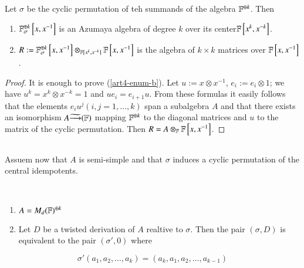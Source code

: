 \begin{prop*}
Let $\sigma$ be the cyclic permutation of teh summands of the algebra $\mathbb{F}^{\oplus k}$. Then
\begin{enumerate}[{\it (a)}]
\item $\mathbb{F}_{\sigma}^{\oplus k}\left[x, x^{-1}\right]$ is an Azumaya algebra of degree $k$ over its center\break $\mathbb{F}\left[x^{k}, x^{-k}\right]$.\label{art4-enum-a}
\item $R:=\mathbb{F}_{\sigma}^{\oplus k}\left[x, x^{-1}\right]\otimes_{\mathbb{F}[x^{k}, x^{-k}]}\mathbb{F}\left[x, x^{-1}\right]$ is the algebra of $k\times k $ matrices over $\mathbb{F}\left[x, x^{-1}\right]$.\label{art4-enum-b}
\end{enumerate}
\end{prop*}

\begin{proof}
It is enough to prove (\ref{art4-enum-b}). Let $u:=x\otimes x^{-1}$, $e_{i}:=e_{i}\otimes 1$; we have $u^{k} = x^{k}\otimes x^{-k} = 1$ and $ue_{i}=e_{i+1}u$. From these formulas it easily follows that the elements
$e_{i}u^{j}(i,j =1,\ldots, k)$ span a subalgebra $A$ and that there exists an isomorphism $A\widetilde{\longrightarrow}(\mathbb{F})$ mapping $\mathbb{F}^{\oplus k}$ to the diagonal matrices and $u$ to the matrix of the cyclic permutation. Then $R=A\otimes_{\mathbb{F}}\mathbb{F}\left[x, x^{-1}\right]$. 
\end{proof}

\subsection{}\label{art4-subsec-1.4}

Assuem now that $A$ is semi-simple and that $\sigma$ induces a cyclic permutation of the central idempotents.
\begin{lemma*}
~

\begin{enumerate}[\it (a)]
\item $A= M_{d}(\mathbb{F})^{\oplus k}$ \label{art4-enum-(a)}
\item Let $D$ be a twisted derivation of $A$ realtive to $\sigma$. Then the pair $(\sigma, D)$ is equivalent to the pair $(\sigma', 0)$ where\label{art4-enum-(b)}
\end{enumerate}
\end{lemma*}
\begin{equation}\label{art4-subseceq-1.4.1}
\sigma'(a_{1}, a_{2},\ldots, a_{k}) = (a_{k},a_{1}, a_{2}, \ldots, a_{k-1})
\end{equation}

